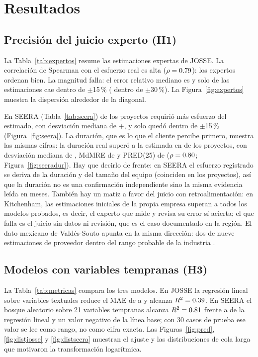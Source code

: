 \documentclass[10pt,twocolumn]{article}
\begin{document}
\section{Resultados}
\subsection{Precisión del juicio experto (H1)}
La Tabla~\ref{tab:expertos} resume las \nJosseExp{} estimaciones expertas de JOSSE. La correlación de Spearman con el esfuerzo real es alta ($\rho=0.79$): los expertos ordenan bien. La magnitud falla: el error relativo mediano es \mdmreJosse{} y solo \predQuinceJosse{} de las estimaciones cae dentro de $\pm$15\,\% (\predTreintaJosse{} dentro de $\pm$30\,\%). La Figura~\ref{fig:expertos} muestra la dispersión alrededor de la diagonal.



En SEERA (Tabla~\ref{tab:seera}) \subestSeera{} de los \nSeera{} proyectos requirió más esfuerzo del estimado, con desviación mediana de +\desvSeera{}, y solo \predQuinceSeera{} quedó dentro de $\pm$15\,\% (Figura~\ref{fig:seera}). La duración, que es lo que el cliente percibe primero, muestra las mismas cifras: la duración real superó a la estimada en \nuevoSeeraDurSobre{} de los proyectos, con desviación mediana de \nuevoSeeraDurMediana{}, MdMRE de \nuevoSeeraDurMdMRE{} y PRED(25) de \nuevoSeeraDurPredVeinticinco{} ($\rho=0.80$; Figura~\ref{fig:seeradur}). Hay que decirlo de frente: en SEERA el esfuerzo registrado se deriva de la duración y del tamaño del equipo (coinciden en los \nSeera{} proyectos), así que la duración no es una confirmación independiente sino la misma evidencia leída en meses. También hay un matiz a favor del juicio con retroalimentación: en Kitchenham, las estimaciones iniciales de la propia empresa superan a todos los modelos probados, es decir, el experto que mide y revisa su error sí acierta; el que falla es el juicio sin datos ni revisión, que es el caso documentado en la región. El dato mexicano de Valdés-Souto apunta en la misma dirección: dos de nueve estimaciones de proveedor dentro del rango probable de la industria \cite{valdessouto2019validation}.



\subsection{Modelos con variables tempranas (H3)}
La Tabla~\ref{tab:metricas} compara los tres modelos. En JOSSE la regresión lineal sobre variables textuales reduce el MAE de \maeJosseBase{} a \maeJosseLin{} y alcanza $R^2=0.39$. En SEERA el bosque aleatorio sobre 21 variables tempranas alcanza $R^2=0.81$ frente a \rdosSeeraLin{} de la regresión lineal y un valor negativo de la línea base; con 30 casos de prueba ese valor se lee como rango, no como cifra exacta. Las Figuras~\ref{fig:pred}, \ref{fig:distjosse} y \ref{fig:distseera} muestran el ajuste y las distribuciones de cola larga que motivaron la transformación logarítmica.
\end{document}
